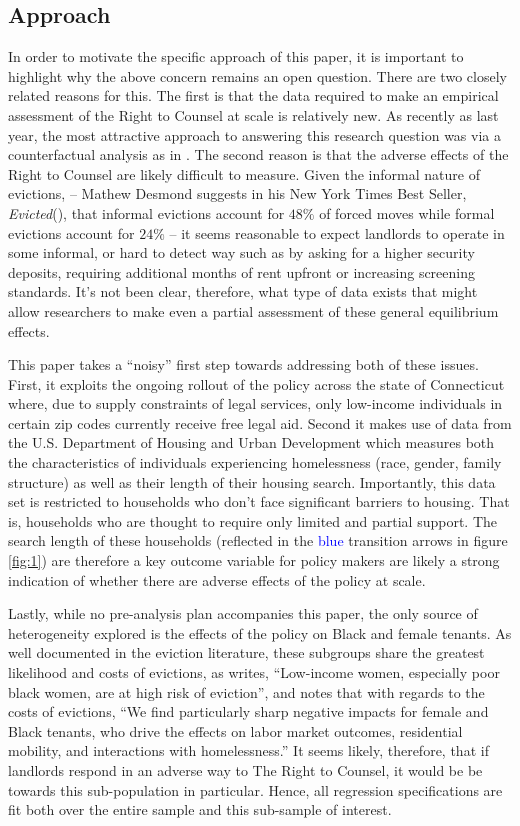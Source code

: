 \documentclass[a4paper,12pt]{article}
\begin{document}
\subsection{Approach}
In order to motivate the specific approach of this paper, it is important to highlight why the above concern remains an open question. There are two closely related reasons for this. The first is that the data required to make an empirical assessment of the Right to Counsel at scale is relatively new. As recently as last year, the most attractive approach to answering this research question was via a counterfactual analysis as in \cite{abramson2021welfare}. The second reason is that the adverse effects of the Right to Counsel are likely difficult to measure. Given the informal nature of evictions, -- Mathew Desmond suggests in his New York Times Best Seller, \textit{Evicted}(\cite{desmond2016evicted}), that informal evictions account for $48\%$ of forced moves while formal evictions account for $24\%$ -- it seems reasonable to expect landlords to operate in some informal, or hard to detect way such as by asking for a higher security deposits, requiring additional months of rent upfront or increasing screening standards. It's not been clear, therefore, what type of data exists that might allow researchers to make even a partial assessment of these general equilibrium effects. \par 
This paper takes a ``noisy'' first step towards addressing both of these issues. First, it exploits the ongoing rollout of the policy across the state of Connecticut where, due to supply constraints of legal services, only low-income individuals in certain zip codes currently receive free legal aid. Second it makes use of data from the U.S. Department of Housing and Urban Development which measures both the characteristics of individuals experiencing homelessness (race, gender, family structure) as well as their length of their housing search. Importantly, this data set is restricted to households who don't face significant barriers to housing. That is, households who are thought to require only limited and partial support. The search length of these households (reflected in the \textcolor{blue}{blue} transition arrows in figure \ref{fig:1}) are therefore a key outcome variable for policy makers are likely a strong indication of whether there are adverse effects of the policy at scale. 

Lastly, while no pre-analysis plan accompanies this paper, the only source of heterogeneity explored is the effects of the policy on Black and female tenants. As well documented in the eviction literature, these subgroups share the greatest likelihood and costs of evictions, as \cite{desmond2019unaffordable} writes, ``Low-income women, especially poor black women, are at high risk of eviction'', and \cite{collinson2022eviction} notes that with regards to the costs of evictions, ``We find particularly sharp negative impacts for female and Black tenants, who drive the effects on labor market outcomes, residential mobility, and interactions with homelessness.'' It seems likely, therefore, that if landlords respond in an adverse way to The Right to Counsel, it would be be towards this sub-population in particular. Hence, all regression specifications are fit both over the entire sample and this sub-sample of interest.
\end{document}
